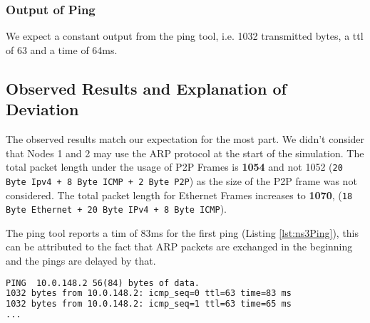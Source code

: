 \documentclass[parskip=full]{scrartcl}
\begin{document}
\subsubsection{Output of Ping}
We expect a constant output from the ping tool, i.e. 1032 transmitted bytes, a ttl of 63 and a time of 64ms.



\subsection{Observed Results and Explanation of Deviation}
The observed results match our expectation for the most part. 
We didn't consider that Nodes 1 and 2 may use the ARP protocol at the start of the simulation.
The total packet length under the usage of P2P Frames is \textbf{1054} and not 1052 (\texttt{20 Byte Ipv4 + 8 Byte ICMP + 2 Byte P2P}) as the size of the P2P frame was not considered.
The total packet length for Ethernet Frames increases to \textbf{1070}, (\texttt{18 Byte Ethernet + 20 Byte IPv4 + 8 Byte ICMP}).

The ping tool reports a tim of 83ms for the first ping (Listing \ref{lst:ns3Ping}), this can be attributed to the fact that ARP packets are exchanged in the beginning and the pings are delayed by that. 
\begin{lstlisting}[language=tex, breaklines, frame=single, caption={Ping output from the ns3 simulation}, label=lst:ns3Ping, float, floatplacement=h]
PING  10.0.148.2 56(84) bytes of data.
1032 bytes from 10.0.148.2: icmp_seq=0 ttl=63 time=83 ms
1032 bytes from 10.0.148.2: icmp_seq=1 ttl=63 time=65 ms
...
\end{lstlisting}


\end{document}
